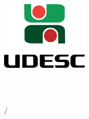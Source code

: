 \thispagestyle{empty}
\center
\begin{minipage}[!]{\linewidth}
	\begin{minipage}[!]{.19\linewidth}
		\includegraphics[width=\textwidth]{img/logo.png}
	\end{minipage}
	\begin{minipage}[!]{.8\linewidth}
		\center
		\textsf{
			\large{
				\instituicao \\ \vspace{0.1cm}
				\centro \\	\vspace{0.17cm}			
				\departamento
			}	
		}		
	\end{minipage}	
\end{minipage}

\vspace{5cm}
\autor

\vspace{2cm}
\textbf{\titulo}\subtitulo

\vfill

\cidade/\estado

\ano
